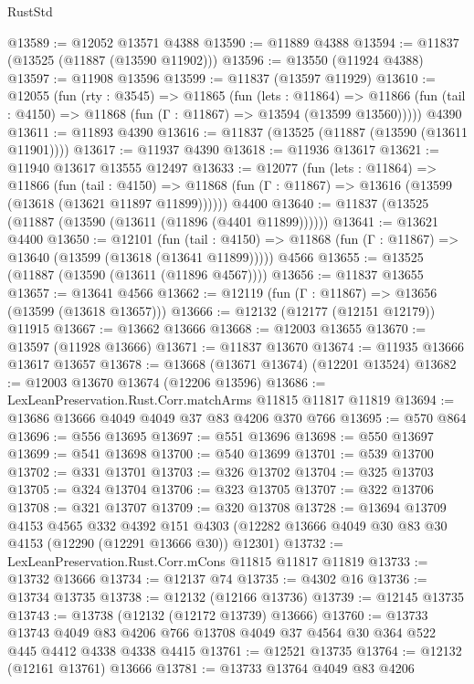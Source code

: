 \begin{lexlean}{RustStd}
\begin{coremodule}
@13589 := @12052 @13571 @4388
@13590 := @11889 @4388
@13594 := @11837 (@13525 (@11887 (@13590 @11902)))
@13596 := @13550 (@11924 @4388)
@13597 := @11908 @13596
@13599 := @11837 (@13597 @11929)
@13610 := @12055
    (fun (rty : @3545) =>
    @11865
      (fun (lets : @11864) =>
      @11866 (fun (tail : @4150) => @11868 (fun (Γ : @11867) => @13594 (@13599 @13560)))))
    @4390
@13611 := @11893 @4390
@13616 := @11837 (@13525 (@11887 (@13590 (@13611 @11901))))
@13617 := @11937 @4390
@13618 := @11936 @13617
@13621 := @11940 @13617 @13555 @12497
@13633 := @12077
    (fun (lets : @11864) =>
    @11866
      (fun (tail : @4150) =>
      @11868 (fun (Γ : @11867) => @13616 (@13599 (@13618 (@13621 @11897 @11899))))))
    @4400
@13640 := @11837 (@13525 (@11887 (@13590 (@13611 (@11896 (@4401 @11899))))))
@13641 := @13621 @4400
@13650 := @12101
    (fun (tail : @4150) => @11868 (fun (Γ : @11867) => @13640 (@13599 (@13618 (@13641 @11899)))))
    @4566
@13655 := @13525 (@11887 (@13590 (@13611 (@11896 @4567))))
@13656 := @11837 @13655
@13657 := @13641 @4566
@13662 := @12119 (fun (Γ : @11867) => @13656 (@13599 (@13618 @13657)))
@13666 := @12132 (@12177 (@12151 @12179)) @11915
@13667 := @13662 @13666
@13668 := @12003 @13655
@13670 := @13597 (@11928 @13666)
@13671 := @11837 @13670
@13674 := @11935 @13666 @13617 @13657
@13678 := @13668 (@13671 @13674) (@12201 @13524)
@13682 := @12003 @13670 @13674 (@12206 @13596)
@13686 := LexLeanPreservation.Rust.Corr.matchArms @11815 @11817 @11819
@13694 := @13686 @13666 @4049 @4049 @37 @83 @4206 @370 @766
@13695 := @570 @864
@13696 := @556 @13695
@13697 := @551 @13696
@13698 := @550 @13697
@13699 := @541 @13698
@13700 := @540 @13699
@13701 := @539 @13700
@13702 := @331 @13701
@13703 := @326 @13702
@13704 := @325 @13703
@13705 := @324 @13704
@13706 := @323 @13705
@13707 := @322 @13706
@13708 := @321 @13707
@13709 := @320 @13708
@13728 := @13694
    @13709
    @4153
    @4565
    @332
    @4392
    @151
    @4303
    (@12282 @13666 @4049 @30 @83 @30 @4153 (@12290 (@12291 @13666 @30)) @12301)
@13732 := LexLeanPreservation.Rust.Corr.mCons @11815 @11817 @11819
@13733 := @13732 @13666
@13734 := @12137 @74
@13735 := @4302 @16
@13736 := @13734 @13735
@13738 := @12132 (@12166 @13736)
@13739 := @12145 @13735
@13743 := @13738 (@12132 (@12172 @13739) @13666)
@13760 := @13733
    @13743
    @4049
    @83
    @4206
    @766
    @13708
    @4049
    @37
    @4564
    @30
    @364
    @522
    @445
    @4412
    @4338
    @4338
    @4415
@13761 := @12521 @13735
@13764 := @12132 (@12161 @13761) @13666
@13781 := @13733
    @13764
    @4049
    @83
    @4206

\end{coremodule}
\end{lexlean}
